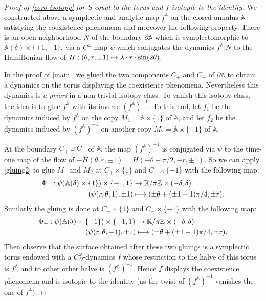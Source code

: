 \documentclass[JEP,XML,SOM,Unicode,NoFloatCountersInSection,Unicode,published]{cedram}
\newcommand\mto{\mathchoice{\longmapsto}{\mapsto}{\mapsto}{\mapsto}}
\newcommand\A{\mathbb A}
\newcommand\R{\mathbb R}
\newcommand\Z{\mathbb Z}
\theoremstyle{definition}
\begin{document}
\begin{proof}[Proof of \cref{coro isotopy} for $S$ equal to the torus and $f$ isotopic to the identity]
We constructed above a symplectic and analytic map $f^\A$ on the closed annulus $\A $ satisfying the coexistence phenomena and moreover the following property.
There is an open neighborhood $N$ of the boundary $\partial \A$ which is symplectomorphic to $\A(\delta)\times \{+1,-1\}$, via a $C^\omega$-map $ \psi$ which conjugates the dynamics $f^\A|N$ to the Hamiltonian flow of $H: (\theta,r, \pm1)\mto \lambda\cdot r\cdot \sin(2\theta)$.

In the proof of \cref{main}, we glued the two components $C_+$ and $C_-$ of $\partial \A$ to obtain a dynamics on the torus displaying the coexistence phenomena. Nevertheless this dynamics is \emph{a priori} in a non-trivial isotopy class. To vanish this isotopy class, the idea is to glue $f^\A$ with its inverse $(f^\A)^{-1}$. To this end, let $f_1$ be the dynamics induced by $f^\A$ on the copy
$M_1=\A\times \{1\}$ of $\A$, and let $f_2 $ be the dynamics induced by $(f^\A)^{-1}$ on another copy
$M_2=\A\times \{-1\}$ of $\A$.

At the boundary $C_+\sqcup C_-$ of $\A$, the map $(f^\A)^{-1}$ is conjugated via $\psi$ to the time-one map of the flow of $-H(\theta, r,\pm1)= H(-\theta -\pi/2, -r,\pm1)$. So we can apply \cref{gluing2} to glue $M_1$ and $M_2$ at $C_+\times \{1\}$ and $C_+\times \{-1\}$ with the following map:
\begin{align*}
\Phi_+: \psi(\A(\delta)\times \{1\})\times \{-1,1\}&\to \R/\pi\Z\times (-\delta,\delta)\\
(\psi(r,\theta,1),\pm1) &\mto (\pm \theta+(\pm1-1)\pi/4,\pm r).
\end{align*}
Similarly the gluing is done at $C_-\times \{1\}$ and $C_-\times \{-1\}$ with the following map:
\begin{align*}
\Phi_-:\psi(\A(\delta)\times \{-1\})\times \{-1,1\}&\to \R/\pi\Z\times (-\delta,\delta)\\
(\psi(r,\theta,-1),\pm1) &\mto (\pm \theta+(\pm1-1)\pi/4,\pm r).
\end{align*}
Then observe that the surface obtained after these two gluings is a symplectic torus endowed with a $C^\omega_\Omega$-dynamics $f$ whose restriction to the halve of this torus is $f^\A$ and to other other halve is $(f^\A)^{-1}$. Hence $f$ displays the coexistence phenomena and is isotopic to the identity (as the twist of $(f^\A)^{-1}$ vanishes the one of $f^\A$).
\end{proof}
\end{document}

